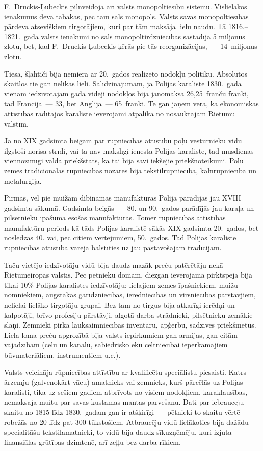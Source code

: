 \documentclass[twoside,a5paper,12pt,fleqn,openany]{extbook}
\begin{document}
F.~Druckis-Ļubeckis pilnveidoja arī valsts monopoltiesību sistēmu. Vislielākos ienākumus deva tabakas, pēc tam sāls monopols. Valsts savas monopoltiesības pārdeva atsevišķiem tirgotājiem, kuri par tām maksāja lielu naudu. Tā 1816.--1821.~gadā valsts ienākumi no sāls monopoltirdzniecības sastādīja 5 miljonus zlotu, bet, kad F.~Druckis-Ļubeckis ķērās pie tās reorganizācijas,~--- 14~miljonus zlotu.

Tiesa, šļahtiči bija nemierā ar 20.~gados realizēto nodokļu politiku. Absolūtos skaitļos tie gan nelikās lieli. Salīdzinājumam, ja Polijas karalistē 1830.~gadā vienam iedzīvotājam gadā vidēji nodokļos bija jānomaksā 26,25~franču franki, tad Francijā~--- 33, bet Anglijā~--- 65~franki. Te gan jāņem vērā, ka ekonomiskās attīstības rādītājos karaliste ievērojami atpalika no nosauktajām Rietumu valstīm.

Ja no XIX gadsimta beigām par rūpniecības attīstību poļu vēsturnieku vidū ilgstoši norisa strīdi, vai tā nav mākslīgi ienesta Polijas karalistē, tad mūsdienās viennozīmīgi valda priekšstats, ka tai bija savi iekšējie priekšnoteikumi. Poļu zemēs tradicionālās rūpniecības nozares bija tekstilrūpniecība, kalnrūpniecība un metalurģija.

Pirmās, vēl pie muižām dibināmās manufaktūras Polijā parādījās jau XVIII gadsimta sākumā. Gadsimta beigās~--- 80. un 90.~gados parādījās jau karaļa un pilsētnieku īpašumā esošas manufaktūras. Tomēr rūpniecības attīstības manufaktūru periods kā tāds Polijas karalistē sākās XIX gadsimta 20.~gados, bet noslēdzās 40. vai, pēc citiem vērtējumiem, 50.~gados. Tad Polijas karalistē rūpniecības attīstība varēja balstīties uz jau pastāvošajām tradīcijām.

Taču vietējo iedzīvotāju vidū bija daudz mazāk preču patērētāju nekā Rietumeiropas valstīs. Pēc pētnieku domām, diezgan ievērojama pirktspēja bija tikai 10\% Polijas karalistes iedzīvotāju: lielajiem zemes īpašniekiem, muižu nomniekiem, augstākās garīdzniecības, ierēdniecības un virsniecības pārstāvjiem, nelielai lielāko tirgotāju grupai. Bez tam no tirgus bija atkarīgi ierēdņi un kalpotāji, brīvo profesiju pārstāvji, algotā darba strādnieki, pilsētnieku zemākie slāņi. Zemnieki pirka lauksaimniecības inventāru, apģērbu, sadzīves priekšmetus. Liela loma preču apgrozībā bija valsts iepirkumiem gan armijas, gan citām vajadzībām (ceļu un kanālu, sabiedrisko ēku celtniecībai iepērkamajiem būvmateriāliem, instrumentiem u.c.).

Valsts veicināja rūpniecības attīstību ar kvalificētu speciālistu piesaisti. Katrs ārzemju (galvenokārt vācu) amatnieks vai zemnieks, kurš pārcēlās uz Polijas karalisti, tika uz sešiem gadiem atbrīvots no visiem nodokļiem, karaklausības, nemaksāja muitu par savas kustamās mantas pārvešanu. Dati par iebraucēju skaitu no 1815 līdz 1830.~gadam gan ir atšķirīgi~--- pētnieki to skaitu vērtē robežās no 20 līdz pat 300 tūkstošiem. Atbraucēju vidū lielākoties bija dažādu specialitāšu tekstilamatnieki, to vidū bija daudz sīkuzņēmēju, kuri izjuta finansiālas grūtības dzimtenē, arī zeļļu bez darba rīkiem.
\end{document}
